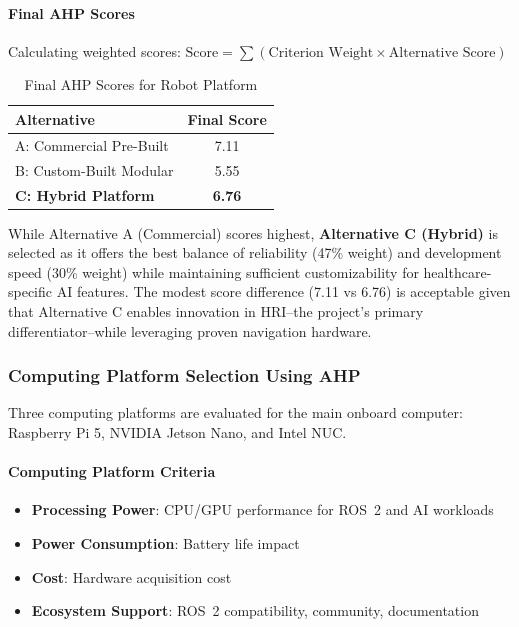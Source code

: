 \paragraph{Final AHP Scores}
Calculating weighted scores: $\text{Score} = \sum (\text{Criterion Weight} \times \text{Alternative Score})$

\begin{table}[H]
\centering
\caption{Final AHP Scores for Robot Platform}
\begin{tabular}{lc}
\toprule
\textbf{Alternative} & \textbf{Final Score} \\
\midrule
A: Commercial Pre-Built & 7.11 \\
B: Custom-Built Modular & 5.55 \\
\textbf{C: Hybrid Platform} & \textbf{6.76} \\
\bottomrule
\end{tabular}
\end{table}

While Alternative A (Commercial) scores highest, \textbf{Alternative C (Hybrid)} is selected as it offers the best balance of reliability (47\% weight) and development speed (30\% weight) while maintaining sufficient customizability for healthcare-specific AI features. The modest score difference (7.11 vs 6.76) is acceptable given that Alternative C enables innovation in HRI--the project's primary differentiator--while leveraging proven navigation hardware.

\subsubsection{Computing Platform Selection Using AHP}
Three computing platforms are evaluated for the main onboard computer: Raspberry Pi 5, NVIDIA Jetson Nano, and Intel NUC.

\paragraph{Computing Platform Criteria}
\begin{itemize}
    \item \textbf{Processing Power}: CPU/GPU performance for ROS~2 and AI workloads
    \item \textbf{Power Consumption}: Battery life impact
    \item \textbf{Cost}: Hardware acquisition cost
    \item \textbf{Ecosystem Support}: ROS~2 compatibility, community, documentation
\end{itemize}

